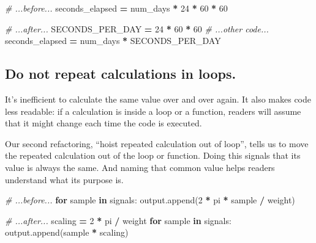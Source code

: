 \documentclass[
]{krantz}
\makeatletter
\newenvironment{Shaded}{\begin{snugshade}}{\end{snugshade}}
\newcommand{\CommentTok}[1]{\textcolor[rgb]{0.56,0.35,0.01}{\textit{#1}}}
\newcommand{\ControlFlowTok}[1]{\textcolor[rgb]{0.13,0.29,0.53}{\textbf{#1}}}
\newcommand{\DecValTok}[1]{\textcolor[rgb]{0.00,0.00,0.81}{#1}}
\newcommand{\KeywordTok}[1]{\textcolor[rgb]{0.13,0.29,0.53}{\textbf{#1}}}
\newcommand{\NormalTok}[1]{#1}
\newcommand{\OperatorTok}[1]{\textcolor[rgb]{0.81,0.36,0.00}{\textbf{#1}}}
\newenvironment{kframe}{%
\medskip{}
\setlength{\fboxsep}{.8em}
 \def\at@end@of@kframe{}%
 \ifinner\ifhmode%
  \def\at@end@of@kframe{\end{minipage}}%
  \begin{minipage}{\columnwidth}%
 \fi\fi%
 \def\FrameCommand##1{\hskip\@totalleftmargin \hskip-\fboxsep
 \colorbox{shadecolor}{##1}\hskip-\fboxsep
     \hskip-\linewidth \hskip-\@totalleftmargin \hskip\columnwidth}%
 \MakeFramed {\advance\hsize-\width
   \@totalleftmargin\z@ \linewidth\hsize
   \@setminipage}}%
 {\par\unskip\endMakeFramed%
 \at@end@of@kframe}
\renewenvironment{Shaded}{\begin{kframe}}{\end{kframe}}
\makeatother
\begin{document}
\begin{Shaded}
\begin{Highlighting}[]
\CommentTok{\# ...before...}
\NormalTok{seconds\_elapsed }\OperatorTok{=}\NormalTok{ num\_days }\OperatorTok{*} \DecValTok{24} \OperatorTok{*} \DecValTok{60} \OperatorTok{*} \DecValTok{60}
\end{Highlighting}
\end{Shaded}

\begin{Shaded}
\begin{Highlighting}[]
\CommentTok{\# ...after...}
\NormalTok{SECONDS\_PER\_DAY }\OperatorTok{=} \DecValTok{24} \OperatorTok{*} \DecValTok{60} \OperatorTok{*} \DecValTok{60}
\CommentTok{\# ...other code...}
\NormalTok{seconds\_elapsed }\OperatorTok{=}\NormalTok{ num\_days }\OperatorTok{*}\NormalTok{ SECONDS\_PER\_DAY}
\end{Highlighting}
\end{Shaded}

\hypertarget{do-not-repeat-calculations-in-loops.}{%
\subsection{Do not repeat calculations in loops.}\label{do-not-repeat-calculations-in-loops.}}

It's inefficient to calculate the same value over and over again.
It also makes code less readable:
if a calculation is inside a loop or a function,
readers will assume that it might change each time the code is executed.

Our second refactoring,
``hoist repeated calculation out of loop'',
tells us to move the repeated calculation out of the loop or function.
Doing this signals that its value is always the same.
And naming that common value helps readers understand what its purpose is.

\begin{Shaded}
\begin{Highlighting}[]
\CommentTok{\# ...before...}
\ControlFlowTok{for}\NormalTok{ sample }\KeywordTok{in}\NormalTok{ signals:}
\NormalTok{    output.append(}\DecValTok{2} \OperatorTok{*}\NormalTok{ pi }\OperatorTok{*}\NormalTok{ sample }\OperatorTok{/}\NormalTok{ weight)}
\end{Highlighting}
\end{Shaded}

\begin{Shaded}
\begin{Highlighting}[]
\CommentTok{\# ...after...}
\NormalTok{scaling }\OperatorTok{=} \DecValTok{2} \OperatorTok{*}\NormalTok{ pi }\OperatorTok{/}\NormalTok{ weight}
\ControlFlowTok{for}\NormalTok{ sample }\KeywordTok{in}\NormalTok{ signals:}
\NormalTok{    output.append(sample }\OperatorTok{*}\NormalTok{ scaling)}
\end{Highlighting}
\end{Shaded}
\end{document}
